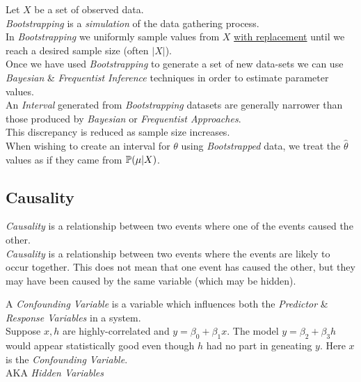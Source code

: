 \documentclass[11pt,a4paper]{article}
\begin{document}
Let $X$ be a set of observed data.\\
\textit{Bootstrapping} is a \textit{simulation} of the data gathering process.\\
In \textit{Bootstrapping} we uniformly sample values from $X$ \underline{with replacement} until we reach a desired sample size (often $|X|$).\\

Once we have used \textit{Bootstrapping} to generate a set of new data-sets we can use \textit{Bayesian} \& \textit{Frequentist Inference} techniques in order to estimate parameter values.\\

An \textit{Interval} generated from \textit{Bootstrapping} datasets are generally narrower than those produced by \textit{Bayesian} or \textit{Frequentist Approaches}.\\
\nb This discrepancy is reduced as sample size increases.\\

When wishing to create an interval for $\theta$ using \textit{Bootstrapped} data, we treat the $\hat\theta$ values as if they came from $\mathbb{P}(\mu|X)$.

\subsection{Causality}

\textit{Causality} is a relationship between two events where one of the events caused the other.\\

\textit{Causality} is a relationship between two events where the events are likely to occur together. This does not mean that one event has caused the other, but they may have been caused by the same variable (which may be hidden).\\

 
A \textit{Confounding Variable} is a variable which influences both the \textit{Predictor} \& \textit{Response Variables} in a system.\\
Suppose $x,h$ are highly-correlated and $y=\beta_0+\beta_1x$. The model $y=\beta_2+\beta_3h$ would appear statistically good even though $h$ had no part in geneating $y$. Here $x$ is the \textit{Confounding Variable}.\\
\nb AKA \textit{Hidden Variables}
\end{document}
